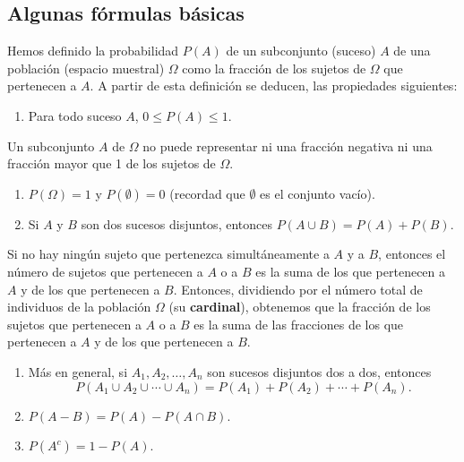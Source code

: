 \documentclass[
  spanish,
  letterpaper,
  DIV=11,
  numbers=noendperiod]{scrreprt}
\providecommand{\tightlist}{%
  \setlength{\itemsep}{0pt}\setlength{\parskip}{0pt}}
\begin{document}
\begin{tcolorbox}
\subsection{Algunas fórmulas
básicas}\label{algunas-fuxf3rmulas-buxe1sicas}

Hemos definido la probabilidad \(P(A)\) de un subconjunto (suceso) \(A\)
de una población (espacio muestral) \(\Omega\) como la fracción de los
sujetos de \(\Omega\) que pertenecen a \(A\). A partir de esta
definición se deducen, las propiedades siguientes:

\begin{enumerate}
\def\labelenumi{\arabic{enumi}.}
\tightlist
\item
  Para todo suceso \(A\), \(0\leqslant P(A)\leqslant 1\).
\end{enumerate}

Un subconjunto \(A\) de \(\Omega\) no puede representar ni una fracción
negativa ni una fracción mayor que 1 de los sujetos de \(\Omega\).

\begin{enumerate}
\def\labelenumi{\arabic{enumi}.}
\setcounter{enumi}{1}
\item
  \(P(\Omega)=1\) y \(P(\emptyset)=0\) (recordad que \(\emptyset\) es el
  conjunto vacío).
\item
  Si \(A\) y \(B\) son dos sucesos disjuntos, entonces
  \(P(A\cup B)=P(A)+P(B)\).
\end{enumerate}

Si no hay ningún sujeto que pertenezca simultáneamente a \(A\) y a
\(B\), entonces el número de sujetos que pertenecen a \(A\) o a \(B\) es
la suma de los que pertenecen a \(A\) y de los que pertenecen a \(B\).
Entonces, dividiendo por el número total de individuos de la población
\(\Omega\) (su \textbf{cardinal}), obtenemos que la fracción de los
sujetos que pertenecen a \(A\) o a \(B\) es la suma de las fracciones de
los que pertenecen a \(A\) y de los que pertenecen a \(B\).

\begin{enumerate}
\def\labelenumi{\arabic{enumi}.}
\setcounter{enumi}{3}
\item
  Más en general, si \(A_1,A_2,\ldots,A_n\) son sucesos disjuntos dos a
  dos, entonces \[
  P(A_1\cup A_2\cup \cdots \cup A_n)=P(A_1)+P(A_2)+\cdots +P(A_n).
  \]
\item
  \(P(A-B)=P(A)-P(A\cap B)\).
\item
  \(P(A^c)=1-P(A)\).
\end{enumerate}


\end{tcolorbox}
\end{document}
